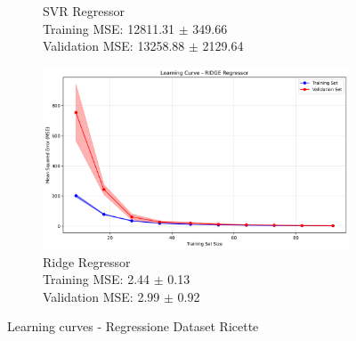 \documentclass[12pt,a4paper]{article}
\begin{document}
\begin{figure}[H]
\begin{subfigure}{0.32\textwidth}
    \caption{SVR Regressor\\Training MSE: 12811.31 $\pm$ 349.66\\Validation MSE: 13258.88 $\pm$ 2129.64}
\end{subfigure}
\hfill
\begin{subfigure}{0.32\textwidth}
    \includegraphics[width=\textwidth]{dati/learning_curve_ricette_ridge.png}
    \caption{Ridge Regressor\\Training MSE: 2.44 $\pm$ 0.13\\Validation MSE: 2.99 $\pm$ 0.92}
\end{subfigure}
\caption{Learning curves - Regressione Dataset Ricette}
\label{fig:learning_curves_regression_ricette}
\end{figure}
\end{document}
